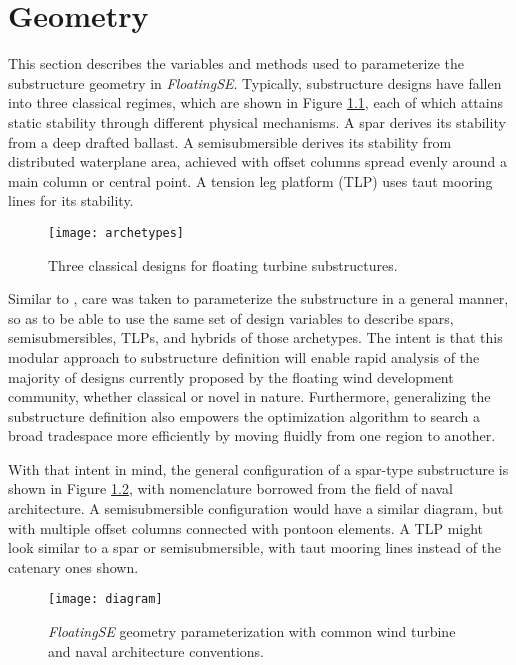 \chapter{Geometry}
\label{sec:geom}
This section describes the variables and methods used to parameterize
the substructure geometry in \textit{FloatingSE}.  Typically,
substructure designs have fallen into three classical regimes, which are
shown in Figure \ref{fig:archetype}, each of which attains static stability
through different physical mechanisms.  A spar derives its stability from a
deep drafted ballast.  A semisubmersible derives its stability from
distributed waterplane area, achieved with offset columns spread evenly
around a main column or central point.  A tension leg platform (TLP) uses taut
mooring lines for its stability.

\begin{figure}[htbp]
  \begin{center}
    \texttt{[image: archetypes]}
    \caption{Three classical designs for floating turbine substructures.}
    \label{fig:archetype}
  \end{center}
\end{figure}

Similar to \citet{karimi2017}, care was taken to parameterize the
substructure in a general manner, so as to be able to use the same set
of design variables to describe spars, semisubmersibles, TLPs, and
hybrids of those archetypes.  The intent is that this modular approach
to substructure definition will enable rapid analysis of the majority of
designs currently proposed by the floating wind development community,
whether classical or novel in nature.  Furthermore, generalizing the
substructure definition also empowers the optimization algorithm to
search a broad tradespace more efficiently by moving fluidly from one
region to another.

With that intent in mind, the general configuration of a spar-type
substructure is shown in Figure \ref{fig:diagram}, with nomenclature
borrowed from the field of naval architecture.  A semisubmersible
configuration would have a similar diagram, but with multiple offset
columns connected with pontoon elements.  A TLP might look similar to a
spar or semisubmersible, with taut mooring lines instead of the catenary
ones shown.

\begin{figure}[htb]
  \begin{center}
    \texttt{[image: diagram]}
    \caption{\textit{FloatingSE} geometry parameterization with common wind turbine and
      naval architecture conventions.}
    \label{fig:diagram}
  \end{center}
\end{figure}

